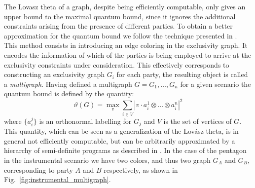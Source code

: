 \documentclass[letterpaper]{article}
\begin{document}
The Lovasz theta of a graph, despite being efficiently computable, only gives an upper bound to the maximal quantum bound, since it ignores the additional constraints arising from the presence of different parties. To obtain a better approximation for the quantum bound we follow the technique presented
in \cite{rabelo2014}. This method consists in introducing an edge coloring in the exclusivity graph. It encodes the information of which of the parties is being employed to arrive at the exclusivity constraints under consideration. This effectively corresponds to constructing an exclusivity graph $G_i$ for each
party, the resulting object is called a \emph{multigraph}. Having defined a multigraph $G = {G_1, \ldots, G_n}$ for a given scenario the
quantum bound is defined by the quantity:
\begin{equation}
    \vartheta(G) = \max_{v} \sum_{i \in V} |v \cdot a^1_i \otimes \dots \otimes a^n_i|^2
    \label{eq:multigraph_lovazs}
\end{equation}
where $\{a^j_i\}$ is an orthonormal labelling for $G_j$ and $V$ is the set of vertices of $G$. This quantity, which can be seen as a generalization of the Lov\'asz theta, is in general not efficiently computable, but can be arbitrarily approximated by a hierarchy of semi-definite programs as described in \cite{rabelo2014}.
In the case of the pentagon in the instrumental scenario we have two colors, and thus two graph $G_A$ and $G_B$, corresponding to party $A$ and $B$ respectively, as shown in Fig.~\ref{fig:instrumental_multigraph}.
\end{document}
